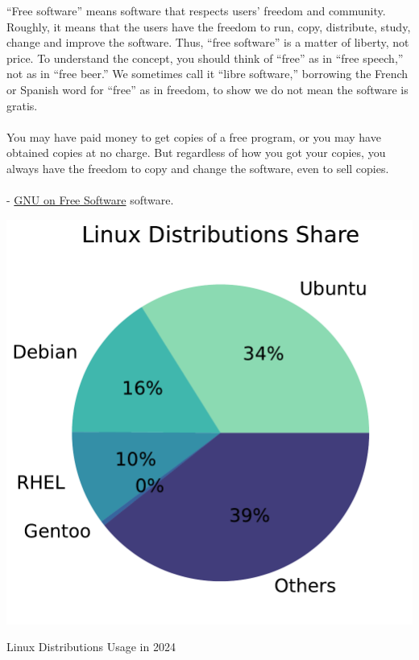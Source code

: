 \begin{itemize}
{      “Free software” means software that respects users' freedom and community. Roughly, it means that the users have the freedom to run, copy, distribute, study, change and improve the software. Thus, “free software” is a matter of liberty, not price. To understand the concept, you should think of “free” as in “free speech,” not as in “free beer.” We sometimes call it “libre software,” borrowing the French or Spanish word for “free” as in freedom, to show we do not mean the software is gratis. \\\\ You may have paid money to get copies of a free program, or you may have obtained copies at no charge. But regardless of how you got your copies, you always have the freedom to copy and change the software, even to sell copies. \\\\ - \href{https://www.gnu.org/philosophy/free-sw.en.html}{GNU on Free Software}
    } software.
\end{itemize}

\begin{marginfigure}
	\includegraphics{images/pdf/dist-chart.pdf}
	\caption[Linux Distributions Usage]{Linux Distributions Usage in 2024}
\end{marginfigure}

